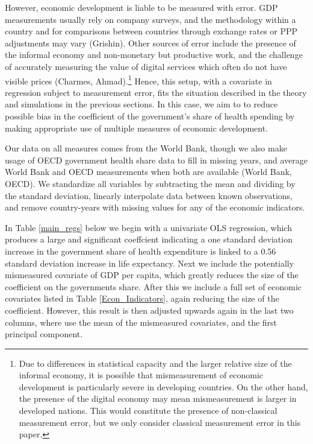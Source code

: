 \documentclass[12pt]{article}
\begin{document}
        However, economic development is liable to be measured with error. GDP measurements usually rely on company surveys, and the methodology within a country and for comparisons between countries through exchange rates or PPP adjustments may vary (Grishin). Other sources of error include the presence of the informal economy and non-monetary but productive work, and the challenge of accurately measuring the value of digital services which often do not have visible prices (Charmes, Ahmad).\footnote{Due to differences in statistical capacity and the larger relative size of the informal economy, it is possible that mismeasurement of economic development is particularly severe in developing countries. On the other hand, the presence of the digital economy may mean mismeasurement is larger in developed nations. This would constitute the presence of non-classical measurement error, but we only consider classical measurement error in this paper.} Hence, this setup, with a covariate in regression subject to measurement error, fits the situation described in the theory and simulations in the previous sections. In this case, we aim to to reduce possible bias in the coefficient of the government's share of health spending by making appropriate use of multiple measures of economic development.

        Our data on all measures comes from the World Bank, though we also make usage of OECD government health share data to fill in missing years, and average World Bank and OECD measurements when both are available (World Bank, OECD). We standardize all variables by subtracting the mean and dividing by the standard deviation, linearly interpolate data between known observations, and remove country-years with missing values for any of the economic indicators.

        In Table \ref{main_regs} below we begin with a univariate OLS regression, which produces a large and significant coeffcient indicating a one standard deviation increase in the government share of health expenditure is linked to a 0.56 standard deviation increase in life expectancy. Next we include the potentially mismeasured covariate of GDP per capita, which greatly reduces the size of the coefficient on the governments share. After this we include a full set of economic covariates listed in Table \ref{Econ_Indicators}, again reducing the size of the coefficient. However, this result is then adjusted upwards again in the last two columns, where use the mean of the mismeasured covariates, and the first principal component.
\end{document}

